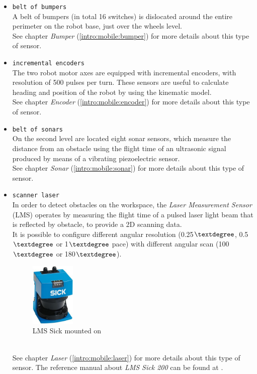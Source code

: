 \begin{itemize}
\item \texttt{belt of bumpers} \\
  A belt of bumpers (in total 16 switches) is dislocated around
  the entire perimeter on the robot base, just over the wheels level. \\
  See chapter \textit{Bumper} (\ref{intro:mobile:bumper}) for more details
  about this type of sensor.

\item \texttt{incremental encoders} \\
  The two robot motor axes are equipped with incremental encoders, with
  resolution of 500 pulses per turn. These sensors are useful to calculate
  heading and position of the robot by using the kinematic model. \\  
  See chapter \textit{Encoder} (\ref{intro:mobile:encoder}) for more details
  about this type of sensor.
 
\item \texttt{belt of sonars} \\
  On the second level are located eight sonar sensors, which measure the
  distance from an obstacle using the flight time of an ultrasonic signal
  produced by means of a vibrating piezoelectric sensor. \\
  See chapter \textit{Sonar} (\ref{intro:mobile:sonar}) for more details
  about this type of sensor.

\item \texttt{scanner laser} \\
  In order to detect obstacles on the workspace, the \textit{Laser Measurement
  Sensor} (LMS) operates by measuring the flight time of a pulsed laser
  light beam that is reflected by obstacle, to provide a 2D scanning data. \\
  It is possible to configure different angular resolution (0.25$\textdegree$,
  0.5$\textdegree$ or 1$\textdegree$ pace) with different angular scan (100$\textdegree$
  or 180$\textdegree$).
  \begin{figure}[h]
    \begin{center}
      \includegraphics[width=60pt]{img/laser_sick_lms_200.jpg}
      \caption{LMS Sick mounted on \morduc{}}
      \label{fig:laser_sick_lms_200}
    \end{center}
  \end{figure}
  \\
  See chapter \textit{Laser} (\ref{intro:mobile:laser}) for more details
  about this type of sensor. The reference manual about \textit{LMS
  Sick 200} can be found at \cite{3morduc:laser_sick_200}.


\end{itemize}
